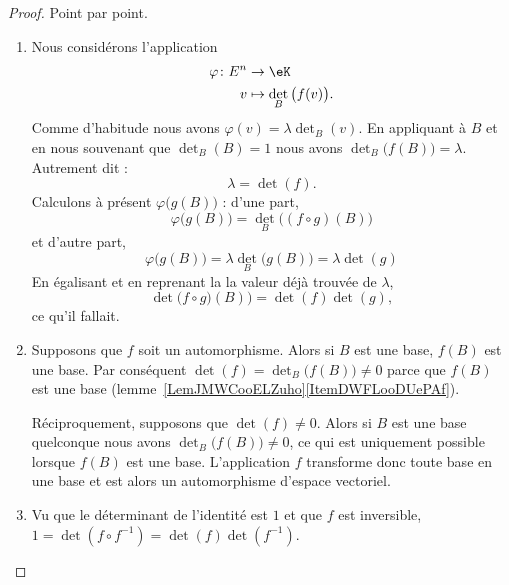 \begin{proof}
    Point par point.
    \begin{enumerate}
        \item
            Nous considérons l'application
            \begin{equation}
                \begin{aligned}
                    \varphi\colon E^n&\to \eK \\
                    v&\mapsto \det_B\big( f(v) \big).
                \end{aligned}
            \end{equation}
            Comme d'habitude nous avons \( \varphi(v)=\lambda\det_B(v)\). En appliquant à \( B\) et en nous souvenant que \( \det_B(B)=1\) nous avons
                $\det_B\big( f(B) \big)=\lambda$. Autrement dit :
                \begin{equation}
                    \lambda=\det(f).
                \end{equation}
            Calculons à présent \( \varphi\big( g(B) \big)\) : d'une part,
            \begin{equation}
                \varphi\big( g(B) \big)=\det_B\big( (f\circ g)(B) \big)
            \end{equation}
            et d'autre part,
            \begin{equation}
                \varphi\big( g(B) \big)=\lambda\det_B\big( g(B) \big)=\lambda\det(g)
            \end{equation}
            En égalisant et en reprenant la la valeur déjà trouvée de \( \lambda\),
            \begin{equation}
                \det\big(f\circ g)(B) \big)=\det(f)\det(g),
            \end{equation}
            ce qu'il fallait.
        \item
            Supposons que \( f\) soit un automorphisme. Alors si \( B\) est une base, \( f(B) \) est une base. Par conséquent \( \det(f)=\det_B\big( f(B) \big)\neq 0\) parce que \( f(B)\) est une base (lemme~\ref{LemJMWCooELZuho}\ref{ItemDWFLooDUePAf}).

            Réciproquement, supposons que \( \det(f)\neq 0\). Alors si \( B\) est une base quelconque nous avons \( \det_B\big( f(B) \big)\neq 0\), ce qui est uniquement possible lorsque \( f(B)\) est une base. L'application \( f\) transforme donc toute base en une base et est alors un automorphisme d'espace vectoriel.
        \item
            Vu que le déterminant de l'identité est \( 1\) et que \( f\) est inversible, \( 1=\det(f\circ f^{-1})=\det(f)\det(f^{-1})\).
    \end{enumerate}
\end{proof}

